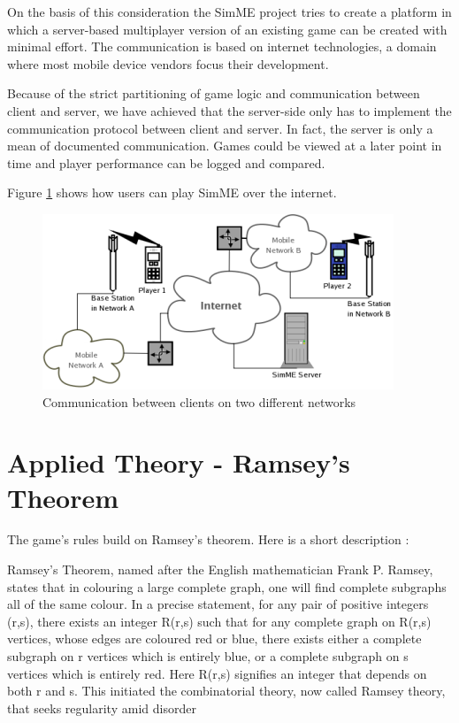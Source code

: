 	On the basis of this consideration the SimME project tries to create a
	platform in which a server-based multiplayer version of an existing game can
	be created with minimal effort. The communication is based on internet
	technologies, a domain where most mobile device vendors focus their
	development.

	Because of the strict partitioning of game logic and communication between
	client and server, we have achieved that the server-side only has to
	implement the communication protocol between client and server. In fact, the
	server is only a mean of documented communication. Games could be viewed at
	a later point in time and player performance can be logged and compared.
	
	Figure \ref{fig:communication} shows how users can play SimME over the
	internet.
	
	\begin{figure}[htbp]
		\begin{center}
			\includegraphics{pics/communication-small.png}
			\caption{Communication between clients on two different networks}
			\label{fig:communication}
		\end{center}
	\end{figure}


\section{Applied Theory - Ramsey's Theorem}

	The game's rules build on Ramsey's theorem. Here is a short description
	\cite{wiki}:
	
	Ramsey's Theorem, named after the English mathematician Frank P. Ramsey,
	states that in colouring a large complete graph, one will find complete
	subgraphs all of the same colour. In a precise statement, for any pair of
	positive integers (r,s), there exists an integer R(r,s) such that for any
	complete graph on R(r,s) vertices, whose edges are coloured red or blue,
	there exists either a complete subgraph on r vertices which is entirely
	blue, or a complete subgraph on s vertices which is entirely red. Here
	R(r,s) signifies an integer that depends on both r and s. This initiated the
	combinatorial theory, now called Ramsey theory, that seeks regularity amid
	disorder
	
